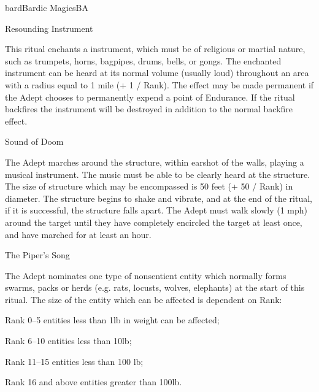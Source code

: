 \begin{College}[2.1]{bard}{Bardic Magics}{BA}
\begin{ritual}[R-2]{Resounding Instrument}

\begin{effects}
This ritual enchants a instrument, which must be of religious or
martial nature, such as trumpets, horns, bagpipes, drums, bells, or
gongs.  The enchanted instrument can be heard at its normal volume
(usually loud) throughout an area with a radius equal to 1 mile (+ 1 /
Rank).  The effect may be made permanent if the Adept chooses to
permanently expend a point of Endurance.  If the ritual backfires the
instrument will be destroyed in addition to the normal backfire
effect.
\end{effects}
\end{ritual}

\begin{ritual}[R-3]{Sound of Doom}

\begin{effects}
The Adept marches around the structure, within earshot of the walls,
playing a musical instrument.  The music must be able to be clearly
heard at the structure.  The size of structure which may be
encompassed is 50 feet (+ 50 / Rank) in diameter.  The structure
begins to shake and vibrate, and at the end of the ritual, if it is
successful, the structure falls apart.  The Adept must walk slowly (1
mph) around the target until they have completely encircled the target
at least once, and have marched for at least an hour.
\end{effects}
\end{ritual}

\begin{ritual}[R-4]{The Piper’s Song}

\begin{effects}
The Adept nominates one type of nonsentient entity which normally
forms swarms, packs or herds (e.g.  rats, locusts, wolves, elephants)
at the start of this ritual.  The size of the entity which can be
affected is dependent on Rank:
\begin{Description}
\item[Rank 0--5] entities less than 1lb in weight can be affected;
\item[Rank 6--10] entities less than 10lb;
\item[Rank 11--15] entities less than 100 lb;
\item[Rank 16 and above] entities greater than 100lb.
\end{Description}


\end{effects}
\end{ritual}
\end{College}
